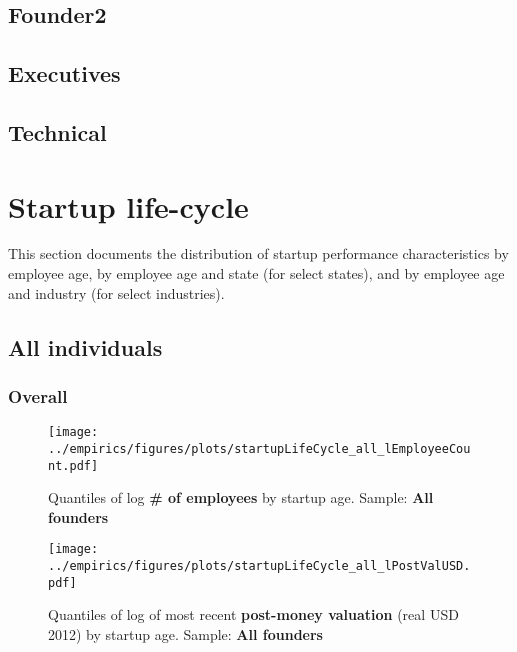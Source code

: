 \documentclass[12pt,english]{article}
\theoremstyle{remark}
\let\Oldsection\section
\renewcommand{\section}{\FloatBarrier\Oldsection}
\let\Oldsubsection\subsection
\renewcommand{\subsection}{\FloatBarrier\Oldsubsection}
\let\Oldsubsubsection\subsubsection
\renewcommand{\subsubsection}{\FloatBarrier\Oldsubsubsection}
\begin{document}
\subsection{Founder2}


\pagebreak

\subsection{Executives}


\pagebreak


\subsection{Technical}


\pagebreak

\section{Startup life-cycle}

This section documents the distribution of startup performance characteristics by employee age, by employee age and state (for select states), and by employee age and industry (for select industries).


\subsection{All individuals}

\subsubsection{Overall}

\begin{figure}[!htb]
	\centering
	\texttt{[image: ../empirics/figures/plots/startupLifeCycle\_all\_lEmployeeCount.pdf]}
	\caption{Quantiles of log \textbf{\# of employees} by startup age. 
		Sample: \textbf{All founders}}
\end{figure}

\begin{figure}[!htb]
	\centering
	\texttt{[image: ../empirics/figures/plots/startupLifeCycle\_all\_lPostValUSD.pdf]}
	\caption{Quantiles of log of most recent \textbf{post-money valuation} (real USD 2012) by startup age. 
		Sample: \textbf{All founders}}
\end{figure}
\end{document}
